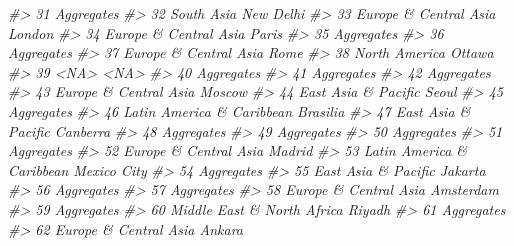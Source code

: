 \documentclass[
  xelatex, ja=standard]{bxjsbook}
\newenvironment{Shaded}{\begin{snugshade}}{\end{snugshade}}
\newcommand{\CommentTok}[1]{\textcolor[rgb]{0.56,0.35,0.01}{\textit{#1}}}
\theoremstyle{definition}
\theoremstyle{definition}
\theoremstyle{definition}
\theoremstyle{definition}
\theoremstyle{remark}
\begin{document}
\begin{Shaded}
\begin{Highlighting}[]
\CommentTok{\#\textgreater{} 31                  Aggregates                    }
\CommentTok{\#\textgreater{} 32                  South Asia           New Delhi}
\CommentTok{\#\textgreater{} 33       Europe \& Central Asia              London}
\CommentTok{\#\textgreater{} 34       Europe \& Central Asia               Paris}
\CommentTok{\#\textgreater{} 35                  Aggregates                    }
\CommentTok{\#\textgreater{} 36                  Aggregates                    }
\CommentTok{\#\textgreater{} 37       Europe \& Central Asia                Rome}
\CommentTok{\#\textgreater{} 38               North America              Ottawa}
\CommentTok{\#\textgreater{} 39                        \textless{}NA\textgreater{}                \textless{}NA\textgreater{}}
\CommentTok{\#\textgreater{} 40                  Aggregates                    }
\CommentTok{\#\textgreater{} 41                  Aggregates                    }
\CommentTok{\#\textgreater{} 42                  Aggregates                    }
\CommentTok{\#\textgreater{} 43       Europe \& Central Asia              Moscow}
\CommentTok{\#\textgreater{} 44         East Asia \& Pacific               Seoul}
\CommentTok{\#\textgreater{} 45                  Aggregates                    }
\CommentTok{\#\textgreater{} 46   Latin America \& Caribbean            Brasilia}
\CommentTok{\#\textgreater{} 47         East Asia \& Pacific            Canberra}
\CommentTok{\#\textgreater{} 48                  Aggregates                    }
\CommentTok{\#\textgreater{} 49                  Aggregates                    }
\CommentTok{\#\textgreater{} 50                  Aggregates                    }
\CommentTok{\#\textgreater{} 51                  Aggregates                    }
\CommentTok{\#\textgreater{} 52       Europe \& Central Asia              Madrid}
\CommentTok{\#\textgreater{} 53   Latin America \& Caribbean         Mexico City}
\CommentTok{\#\textgreater{} 54                  Aggregates                    }
\CommentTok{\#\textgreater{} 55         East Asia \& Pacific             Jakarta}
\CommentTok{\#\textgreater{} 56                  Aggregates                    }
\CommentTok{\#\textgreater{} 57                  Aggregates                    }
\CommentTok{\#\textgreater{} 58       Europe \& Central Asia           Amsterdam}
\CommentTok{\#\textgreater{} 59                  Aggregates                    }
\CommentTok{\#\textgreater{} 60  Middle East \& North Africa              Riyadh}
\CommentTok{\#\textgreater{} 61                  Aggregates                    }
\CommentTok{\#\textgreater{} 62       Europe \& Central Asia              Ankara}

\end{Highlighting}
\end{Shaded}
\end{document}
